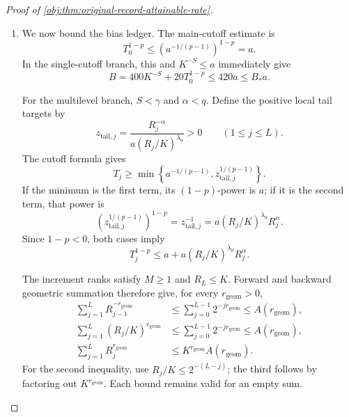 \documentclass[11pt]{article}
\begin{document}
\begin{proof}[Proof of \cref{obj:thm:original-record-attainable-rate}]
\begin{enumerate}
The bounds \(E/\gamma\le1\), \(E/S<2\), and \(E/(p-1)<1\) give
\[
a^{-1/\gamma}=s^{E/\gamma}\le s,
\qquad
a^{-1/S}=s^{E/S}\le s^2,
\qquad
1\le a^{-1/(p-1)}=s^{E/(p-1)}\le s.
\]
Thus \(M\le2s\). For the fine rank, if \(a^{-1/S}\le M\), dyadic idempotence gives \(K=M\le2s\le2s^2\); if \(M<a^{-1/S}\), rounding gives \(K\le2a^{-1/S}\le2s^2\). In either case,
\[
M\le2s,\qquad K\le2s^2.
\]

For the increment-cutoff bounds, the public quantities in either score branch are
\[
L=\log_2(K/M)\in\mathbb N_0,\qquad
R_j=2^jM\quad(0\le j\le L),
\]
\[
T_j=
\mathcal R\!\left(
\max\left\{
1,\min\left\{
a^{-1/(p-1)},
\left[
\frac{R_j^{-\alpha}}{a(R_j/K)^{\lambda_0}}
\right]^{1/(p-1)}
\right\}
\right\}
\right)
\quad(1\le j\le L).
\]
The single-cutoff score uses the main cutoff
\[
T_0=\mathcal R(a^{-1/(p-1)}).
\]
Since the argument defining each \(T_j\) lies between \(1\) and
\(a^{-1/(p-1)}\), rounding and monotonicity yield
\[
1\le T_0\le2s,\qquad
1\le T_j\le T_0\quad(1\le j\le L).
\]
These statements also cover \(L=0\), when the increment index set is empty.

\item We now bound the bias ledger. The main-cutoff estimate is
\[
T_0^{1-p}
\le\left(a^{-1/(p-1)}\right)^{1-p}
=a.
\]
In the single-cutoff branch, this and \(K^{-S}\le a\) immediately give
\[
B=400K^{-S}+20T_0^{1-p}\le420a\le B_*a.
\]

For the multilevel branch, \(S<\gamma\) and \(\alpha<q\). Define the positive local tail targets by
\[
z_{\mathrm{tail},j}
=\frac{R_j^{-\alpha}}{a(R_j/K)^{\lambda_0}}>0
\qquad(1\le j\le L).
\]
The cutoff formula gives
\[
T_j\ge
\min\left\{a^{-1/(p-1)},z_{\mathrm{tail},j}^{1/(p-1)}\right\}.
\]
If the minimum is the first term, its \((1-p)\)-power is \(a\); if it is the second term, that power is
\[
\left(z_{\mathrm{tail},j}^{1/(p-1)}\right)^{1-p}
=z_{\mathrm{tail},j}^{-1}
=a(R_j/K)^{\lambda_0}R_j^\alpha.
\]
Since \(1-p<0\), both cases imply
\[
T_j^{1-p}
\le a+a(R_j/K)^{\lambda_0}R_j^\alpha.
\]

The increment ranks satisfy \(M\ge1\) and \(R_L\le K\). Forward and backward geometric summation therefore give, for every \(r_{\mathrm{geom}}>0\),
\[
\begin{aligned}
\sum_{j=1}^{L}R_{j-1}^{-r_{\mathrm{geom}}}
&\le\sum_{j=0}^{L-1}2^{-jr_{\mathrm{geom}}}
\le A(r_{\mathrm{geom}}),\\
\sum_{j=1}^{L}(R_j/K)^{r_{\mathrm{geom}}}
&\le\sum_{j=0}^{L-1}2^{-jr_{\mathrm{geom}}}
\le A(r_{\mathrm{geom}}),\\
\sum_{j=1}^{L}R_j^{r_{\mathrm{geom}}}
&\le K^{r_{\mathrm{geom}}}A(r_{\mathrm{geom}}).
\end{aligned}
\]
For the second inequality, use \(R_j/K\le2^{-(L-j)}\); the third follows by factoring out \(K^{r_{\mathrm{geom}}}\). Each bound remains valid for an empty sum.


\end{enumerate}
\end{proof}
\end{document}
